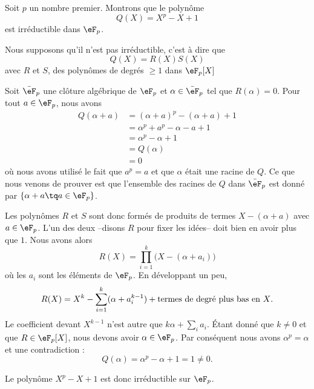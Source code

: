 \begin{example}     \label{ExfUqQXQ}
    Soit \( p\) un nombre premier. Montrons que le polynôme 
    \begin{equation}
        Q(X)=X^p-X+1
    \end{equation}
    est irréductible dans \( \eF_p\). 

    Nous supposons qu'il n'est pas irréductible, c'est à dire que
    \begin{equation}
        Q(X)=R(X)S(X)
    \end{equation}
    avec \( R\) et \( S\), des polynômes de degrés \( \geq 1\) dans \( \eF_p[X]\)

    Soit \( \bar\eF_p\) une clôture algébrique de \( \eF_p\) et \( \alpha\in \bar \eF_p\) tel que \( R(\alpha)=0\). Pour tout \( a\in \eF_p\), nous avons
    \begin{subequations}
        \begin{align}
            Q(\alpha+a)&=(\alpha+a)^p-(\alpha+a)+1\\
            &=\alpha^p+a^p-\alpha-a+1\\
            &=\alpha^p-\alpha+1\\
            &=Q(\alpha)\\
            &=0
        \end{align}
    \end{subequations}
    où nous avons utilisé le fait que \( a^p=a\) et que \( \alpha\) était une racine de \( Q\). Ce que nous venons de prouver est que l'ensemble des racines de \( Q\) dans \( \bar\eF_p\) est donné par \( \{ \alpha+a\tq a\in \eF_p \}\).

    Les polynômes \( R\) et \( S\) sont donc formés de produits de termes \( X-(\alpha+a)\) avec \( a\in \eF_p\). L'un des deux --disons \( R\) pour fixer les idées-- doit bien en avoir plus que \( 1\). Nous avons alors
    \begin{equation}
        R(X)=\prod_{i=1}^{k}\big( X-(\alpha+a_i) \big)
    \end{equation}
    où les \( a_i\) sont les éléments de \( \eF_p\). En développant un peu,
    \begin{equation}
        R(X)=X^k-\sum_{i=1}^k(\alpha+a_i^{k-1})+\text{termes de degré plus bas en \( X\)}.
    \end{equation}
    Le coefficient devant \( X^{k-1}\) n'est autre que \( k\alpha+\sum_ia_i\). Étant donné que \( k\neq 0\) et que \( R\in \eF_p[X]\), nous devons avoir \( \alpha\in \eF_p\). Par conséquent nous avons \( \alpha^p=\alpha\) et une contradiction :
    \begin{equation}
        Q(\alpha)=\alpha^p-\alpha+1=1\neq 0.
    \end{equation}

    Le polynôme \( X^p-X+1\) est donc irréductible sur \( \eF_p\).
\end{example}

